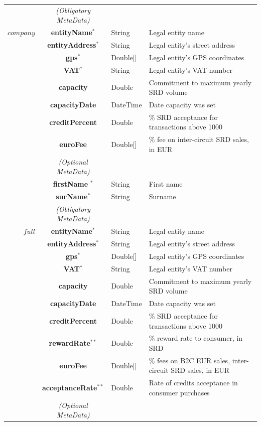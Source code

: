 \begin{table}[H]
\begin{centering}
{\begin{tabular}{ r | c | l | l }
\Xhline{1.5pt}
			& \emph{(Obligatory MetaData)} & & \\
\cline{2-2}
$company$	& {\bf entityName}$^*$		&String	& Legal entity name \\
			& {\bf entityAddress}$^*$		&String	& Legal entity's street address \\
			& {\bf gps}$^*$				&Double[]	& Legal entity's GPS coordinates \\
			& {\bf VAT}$^*$				&String	& Legal entity's VAT number \\
			& {\bf capacity}				&Double	& Commitment to maximum yearly SRD volume \\
			& {\bf capacityDate}			&DateTime & Date capacity was set \\
			& {\bf creditPercent}			&Double	& \% SRD acceptance for transactions above 1000 \\
			& {\bf euroFee}				&Double[]	& \% fee on inter-circuit SRD sales, in EUR \\
\cline{2-2}
			 & \emph{(Optional MetaData)}& & \\
\cline{2-2}
			& {\bf firstName	}$^*$			&String & First name \\
			& {\bf surName}$^*$			&String & Surname \\
\Xhline{1.5pt}
			& \emph{(Obligatory MetaData)} & & \\
\cline{2-2}
$full$		& {\bf entityName}$^*$		&String	& Legal entity name \\
			& {\bf entityAddress}$^*$		&String	& Legal entity's street address \\
			& {\bf gps}$^*$				&Double[]	& Legal entity's GPS coordinates \\
			& {\bf VAT}$^*$				&String	& Legal entity's VAT number \\
			& {\bf capacity}				&Double	& Commitment to maximum yearly SRD volume \\
			& {\bf capacityDate}			&DateTime & Date capacity was set \\
			& {\bf creditPercent}			&Double	& \% SRD acceptance for transactions above 1000 \\
			& {\bf rewardRate}$^{**}$		&Double	& \% reward rate to consumer, in SRD \\
			& {\bf euroFee}				&Double[]	& \% fees on B2C EUR sales, inter-circuit SRD sales, in EUR \\
			& {\bf acceptanceRate}$^{**}$	&Double	& Rate of credits acceptance in consumer purchases\\
\cline{2-2}
			 & \emph{(Optional MetaData)}& & \\

\end{tabular}}
\end{centering}
\end{table}
